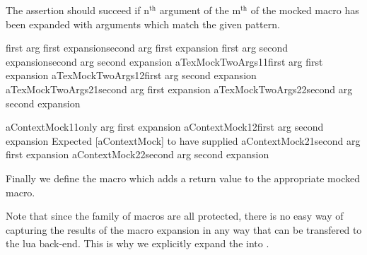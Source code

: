 The \type{\assertMockNthArgumentOnMthExpansionMatches} assertion should 
succeed if $\text{n}^{\text{th}}$ argument of the $\text{m}^{\text{th}}$ 
of the mocked macro has been expanded with arguments which match the given 
pattern. 

\startConTest
\startMocking
  \aTexMockTwoArgs%
    {first arg first expansion}{second arg first expansion}
  \aTexMockTwoArgs%
    {first arg second expansion}{second arg second expansion}
  \assertMockNthArgumentOnMthExpansionMatches%
    {aTexMockTwoArgs}{1}{1}{first arg first expansion}{}
  \assertMockNthArgumentOnMthExpansionMatches%
    {aTexMockTwoArgs}{1}{2}{first arg second expansion}{}
  \assertMockNthArgumentOnMthExpansionMatches%
    {aTexMockTwoArgs}{2}{1}{second arg first expansion}{}
  \assertMockNthArgumentOnMthExpansionMatches%
    {aTexMockTwoArgs}{2}{2}{second arg second expansion}{}
\stopMocking
\stopConTest

\stopTestCase

\startConTest
\startMocking
  \assertMockNthArgumentOnMthExpansionMatches%
    {aContextMock}{1}{1}{only arg first expansion}{}
  \assertMockNthArgumentOnMthExpansionMatches%
    {aContextMock}{1}{2}{first arg second expansion}{}
  \startAssertShouldFail{}%
    {Expected [aContextMock] to have supplied}%
    {}
    \assertMockNthArgumentOnMthExpansionMatches%
      {aContextMock}{2}{1}{second arg first expansion}{}
  \stopAssertShouldFail
  \assertMockNthArgumentOnMthExpansionMatches%
    {aContextMock}{2}{2}{second arg second expansion}{}
\stopMocking
\stopConTest
\stopTestCase

\stopTestSuite


Finally we define the \type{\addMockResult} macro which adds a return 
value to the appropriate mocked macro. 

\startMkIVCode
\def\addMockResult#1#2{%
  \directlua{%
    thirddata.contests.addMockResult('#1', '#2')
  }
}
\stopMkIVCode


Note that since the  family of macros are all 
protected, there is no easy way of capturing the results of the macro 
expansion in any way that can be transfered to the lua back-end. This is 
why we explicitly expand the \type{\aContextMock[anArg]} into 
. 

